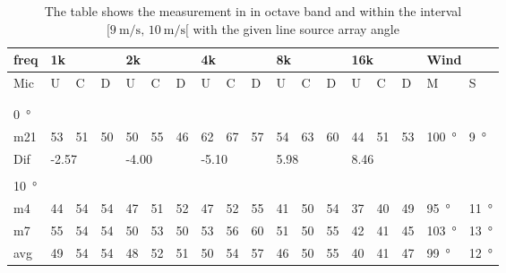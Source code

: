 \begin{table}[H]
\centering
\caption{The table shows the measurement in in octave band and within the interval $[\SI{9}{\meter\per\second},\, \SI{10}{\meter\per\second}[ $ with the given line source array angle}
\setlength\tabcolsep{5pt} %
\begin{tabular}{l|l|l|l|l|l|l|l|l|l|l|l|l|l|l|l|l|l}
freq & \multicolumn{3}{l|}{1k} & \multicolumn{3}{l|}{2k} & \multicolumn{3}{l|}{4k} & \multicolumn{3}{l|}{8k} & \multicolumn{3}{l|}{16k}   &  \multicolumn{2}{l}{Wind}                      \\ \hline
Mic  & U      & C      & D     & U      & C      & D     & U      & C      & D     & U      & C      & D     & U  & C  & D & M &S \\ \hline
 & \multicolumn{3}{l|}{} & \multicolumn{3}{l|}{} & \multicolumn{3}{l|}{} & \multicolumn{3}{l|}{} & \multicolumn{3}{l|}{} &      \multicolumn{2}{l}{}                        \\ 
 \multicolumn{18}{l}{ } \\  
\SI{0}{\degree}   & \multicolumn{3}{l|}{} & \multicolumn{3}{l|}{} & \multicolumn{3}{l|}{} & \multicolumn{3}{l|}{} &  \multicolumn{3}{l|}{}   & \multicolumn{2}{l}{} \\  \hline
m21  & 53     & 51     & 50    & 50     & 55     & 46    & 62     & 67     & 57    & 54     & 63     & 60    & 44 & 51 & 53    & \SI{100}{\degree} & \SI{9}{\degree}  \\ \hline 
Dif & \multicolumn{3}{l|}{-2.57} & \multicolumn{3}{l|}{-4.00} & \multicolumn{3}{l|}{-5.10} & \multicolumn{3}{l|}{5.98} &  \multicolumn{3}{l|}{8.46}  & \multicolumn{2}{l}{} \\ 
 \multicolumn{18}{l}{ } \\                             
\SI{10}{\degree}   & \multicolumn{3}{l|}{} & \multicolumn{3}{l|}{} & \multicolumn{3}{l|}{} & \multicolumn{3}{l|}{} &  \multicolumn{3}{l|}{}   & \multicolumn{2}{l}{} \\  \hline
m4    & 44     & 54     &  54    &  47    &  51    &   52   &  47    &  52     &  55    &  41     & 50     &  54    & 37 & 40 & 49   & \SI{95}{\degree} & \SI{11}{\degree}  \\
m7    & 55     & 54     &  54    &   50   &   53   &  50    &  53    &  56     &  60    &  51     & 50     & 55     & 42 & 41 & 45   & \SI{103}{\degree} & \SI{13}{\degree}  \\ \hline
avg &  49    &  54    & 54     &  48    &  52    & 51     & 50     &   54    &   57   &  46     & 50     &  55    & 40 & 41  & 47    & \SI{99}{\degree} & \SI{12}{\degree}  \\ \hline  

\end{tabular}
\end{table}
